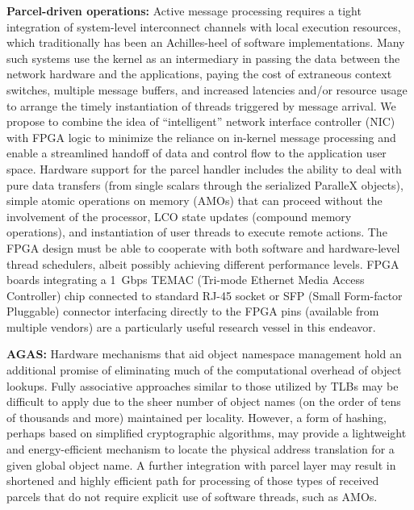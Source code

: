 \documentclass{revtex4}
\newcommand{\B}[1]{\textbf{#1}}
\begin{document}
\B{Parcel-driven operations:}
Active message processing requires a tight integration of system-level
interconnect channels with local execution resources, which traditionally
has been an Achilles-heel of software implementations.
Many such systems use the kernel as an intermediary in passing the data
between the network hardware and the applications, paying the cost
of extraneous context switches, multiple message buffers, and increased
latencies and/or resource usage to arrange the timely instantiation of
threads triggered by message arrival.
We propose to combine the idea of ``intelligent'' network 
interface controller (NIC)~\cite{druschel_nic_1994}
with FPGA logic to minimize the reliance on in-kernel message processing
and enable a streamlined handoff of data and control flow to the
application user space.
Hardware support for the parcel handler includes the ability to deal
with pure data transfers (from single scalars through the serialized
ParalleX objects), simple atomic operations on memory
(AMOs) that can proceed without the involvement of the processor, LCO
state updates (compound memory operations), and instantiation of user
threads to execute remote actions.
The FPGA design must be able to cooperate with both software and
hardware-level thread schedulers, albeit possibly achieving different
performance levels.
FPGA boards integrating a 1~Gbps TEMAC (Tri-mode
Ethernet Media Access Controller) chip connected to standard RJ-45 socket
or SFP (Small Form-factor Pluggable) connector interfacing directly to the
FPGA pins (available from multiple vendors) are a particularly useful 
research vessel in this endeavor.

\B{AGAS:}
Hardware mechanisms that aid object namespace management hold an additional
promise of eliminating much of the computational overhead of object
lookups.
Fully associative approaches similar to those utilized by
TLBs may be difficult to apply due to the sheer number of object names 
(on the order of tens of thousands and more) maintained per locality.
However, a form of hashing, perhaps based on simplified cryptographic 
algorithms, may provide a lightweight and energy-efficient mechanism
to locate the physical address translation for a given global object name.
A further integration with parcel layer may result in shortened and
highly efficient path for processing of those types of received 
parcels that do not require explicit use of software threads, such as AMOs.
\end{document}
